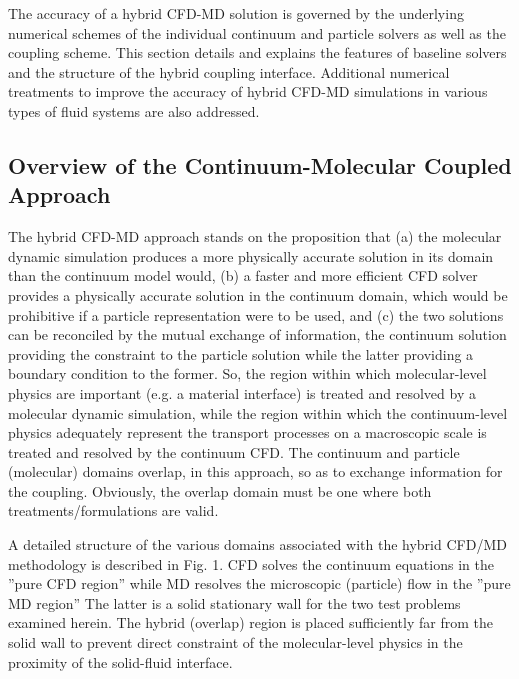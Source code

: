 \documentclass[preprint,12pt]{elsarticle}
\begin{document}
The accuracy of a hybrid CFD-MD solution is governed by the underlying numerical schemes of the individual continuum and particle solvers as well as the coupling scheme. This section details and explains the features of baseline solvers and the structure of the hybrid coupling interface. Additional numerical treatments to improve the accuracy of hybrid CFD-MD simulations in various types of fluid systems are also addressed.


\subsection{Overview of the Continuum-Molecular Coupled Approach}
\label{sec:numerical_hybridoverview}

The hybrid CFD-MD approach stands on the proposition that (a) the molecular dynamic simulation produces a more physically accurate solution in its domain than the continuum model would, (b) a faster and more efficient CFD solver provides a physically accurate solution in the continuum domain, which would be prohibitive if a particle representation were to be used, and (c) the two solutions can be reconciled by the mutual exchange of information, the continuum solution providing the constraint to the particle solution while the latter providing a boundary condition to the former. So, the region within which molecular-level physics are important (e.g. a material interface) is treated and resolved by a molecular dynamic simulation, while the region within which the continuum-level physics adequately represent the transport processes on a macroscopic scale is treated and resolved by the continuum CFD. The continuum and particle (molecular) domains overlap, in this approach, so as to exchange information for the coupling. Obviously, the overlap domain must be one where both treatments/formulations are valid.

A detailed structure of the various domains associated with the hybrid CFD/MD methodology is described in Fig. 1. CFD solves the continuum equations in the ''pure CFD region'' while MD resolves the microscopic (particle) flow in the ''pure MD region'' The latter is a solid stationary wall for the two test problems examined herein. The hybrid (overlap) region is placed sufficiently far from the solid wall to prevent direct constraint of the molecular-level physics in the proximity of the solid-fluid interface. 
\end{document}
